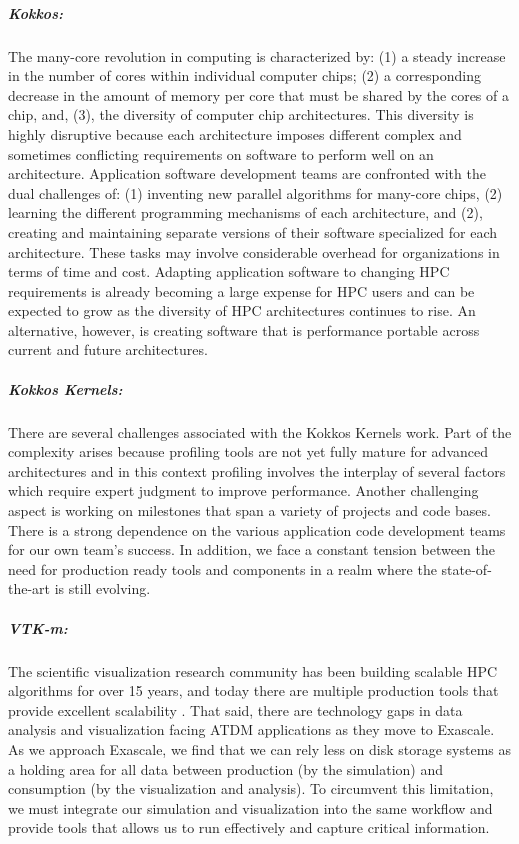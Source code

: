\subparagraph{Kokkos:} The many-core revolution in computing is characterized by:
(1) a steady increase in the number of cores within individual computer chips;
(2) a corresponding decrease in the amount of memory per core that must be shared by the cores of a chip, and,
(3), the diversity of computer chip architectures.
This diversity is highly disruptive because each architecture imposes different complex
and sometimes conflicting requirements on software to perform well on an architecture.
Application software development teams are confronted with the dual challenges of:
(1) inventing new parallel algorithms for many-core chips,
(2) learning the different programming mechanisms of each architecture, and
(2), creating and maintaining separate versions of their software specialized for each architecture.
These tasks may involve considerable overhead for organizations in terms of time and cost.
Adapting application software to changing HPC requirements is already becoming a large expense for
HPC users and can be expected to grow as the diversity of HPC architectures continues to rise.
An alternative, however, is creating software that is performance portable across current and future architectures.

\subparagraph{Kokkos Kernels:} There are several challenges associated with the Kokkos Kernels work. Part of the complexity arises because profiling tools are not yet fully mature for advanced architectures and in this context profiling involves the interplay of several factors which require expert judgment to improve performance.  Another challenging aspect is working on milestones that span a variety of projects and code bases. There is a strong dependence on the various application code development teams for our own team's success. In addition, we face a constant tension between the need for production ready tools and components in a realm where the state-of-the-art is still evolving.

\subparagraph{VTK-m:} The scientific visualization research community has been building scalable HPC algorithms for over 15 years, and today there are multiple production tools that provide excellent scalability \cite{ParaView,Catalyst}. That said, there are technology gaps in data analysis and visualization facing ATDM applications as they move to Exascale.  As we approach Exascale, we find that we can rely less on disk storage systems as a holding area for all data between production (by the simulation) and consumption (by the visualization and analysis). To circumvent this limitation, we must integrate our simulation and visualization into the same workflow and provide tools that allows us to run effectively and capture critical information.

